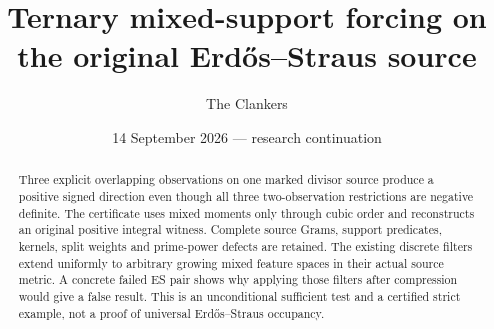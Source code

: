 \documentclass[10pt,a4paper]{article}
\title{Ternary mixed-support forcing on the original Erd\H{o}s--Straus source}
\author{The Clankers}
\date{14 September 2026 --- research continuation}
\begin{document}
\maketitle
\begin{abstract}
Three explicit overlapping observations on one marked divisor source produce
a positive signed direction even though all three two-observation restrictions
are negative definite. The certificate uses mixed moments only through cubic
order and reconstructs an original positive integral witness. Complete source
Grams, support predicates, kernels, split weights and prime-power defects are
retained. The existing discrete filters extend uniformly to arbitrary growing
mixed feature spaces in their actual source metric. A concrete failed ES pair
shows why applying those filters after compression would give a false result.
This is an unconditional sufficient test and a certified strict example, not a
proof of universal Erd\H{o}s--Straus occupancy.
\end{abstract}


\end{document}
